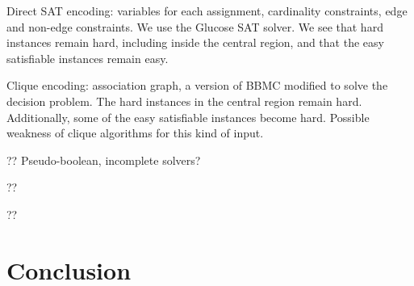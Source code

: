 \documentclass[letterpaper]{article}
\begin{document}
Direct SAT encoding: variables for each assignment, cardinality constraints, edge and non-edge
constraints. We use the Glucose SAT solver. We see that hard instances remain hard, including inside
the central region, and that the easy satisfiable instances remain easy.

Clique encoding: association graph, a version of BBMC modified to solve the decision problem. The
hard instances in the central region remain hard. Additionally, some of the easy satisfiable
instances become hard. Possible weakness of clique algorithms for this kind of input.

?? Pseudo-boolean, incomplete solvers?

?? \cite{Anton:2009}

?? \cite{Lipets:2009}

\section{Conclusion}



\end{document}
